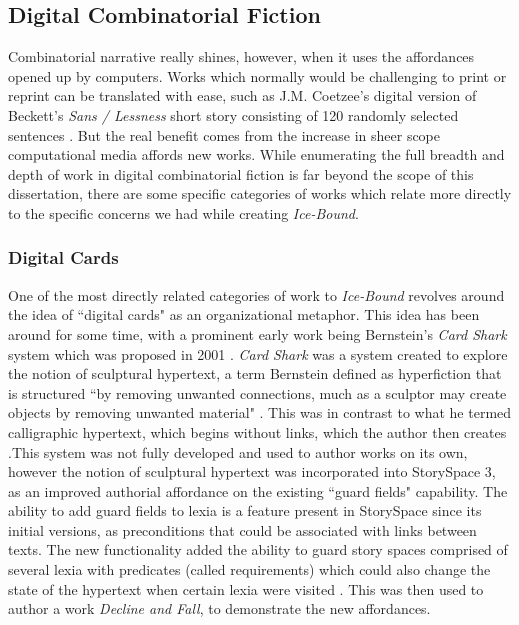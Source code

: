 \subsection{Digital Combinatorial Fiction}\label{subsec:digital-combinatorial-fiction}

Combinatorial narrative really shines, however, when it uses the affordances opened up by computers. Works which normally would be challenging to print or reprint can be translated with ease, such as J.M. Coetzee's digital version of Beckett's \textit{Sans / Lessness} short story consisting of 120 randomly selected sentences \cite{lessness}. But the real benefit comes from the increase in sheer scope computational media affords new works. While enumerating the full breadth and depth of work in digital combinatorial fiction is far beyond the scope of this dissertation, there are some specific categories of works which relate more directly to the specific concerns we had while creating \textit{Ice-Bound}.

\subsubsection{Digital Cards}\label{subsubsec:digital-cards}

One of the most directly related categories of work to \textit{Ice-Bound} revolves around the idea of ``digital cards" as an organizational metaphor. This idea has been around for some time, with a prominent early work being Bernstein's \textit{Card Shark} system which was proposed in 2001 \cite{bernstein_cardshark}. \textit{Card Shark} was a system created to explore the notion of sculptural hypertext, a term Bernstein defined as hyperfiction that is structured ``by removing unwanted connections, much as a sculptor may create objects by removing unwanted material" \cite{bernstein_cardshark}. This was in contrast to what he termed calligraphic hypertext, which begins without links, which the author then creates \cite{bernstein_2007}.This system was not fully developed and used to author works on its own, however the notion of sculptural hypertext was incorporated into StorySpace 3, as an improved authorial affordance on the existing ``guard fields" capability. The ability to add guard fields to lexia is a feature present in StorySpace since its initial versions, as preconditions that could be associated with links between texts. The new functionality added the ability to guard story spaces comprised of several lexia with predicates (called requirements) which could also change the state of the hypertext when certain lexia were visited \cite{bernstein_decline}. This was then used to author a work \textit{Decline and Fall}, to demonstrate the new affordances.


